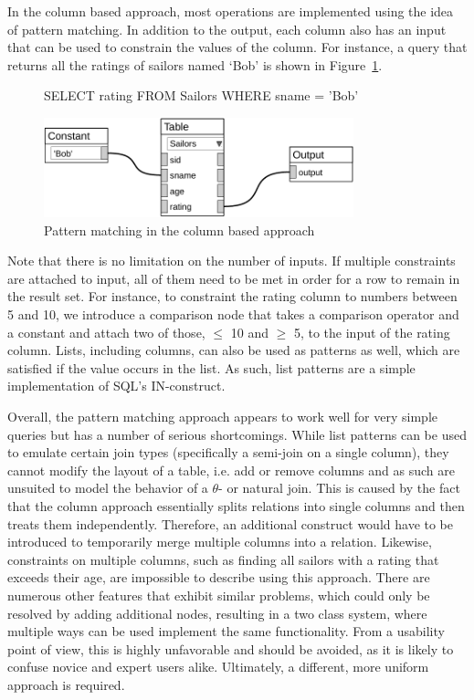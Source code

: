 \documentclass[11pt,a4paper]{globis-book}
\begin{document}
In the column based approach, most operations are implemented using the idea of pattern matching. In addition to the output, each column also has an input that can be used to constrain the values of the column. For instance, a query that returns all the ratings of sailors named `Bob' is shown in Figure~\ref{fig:col_patmat}.

\begin{figure}[h]
\begin{codeex}
SELECT rating
FROM Sailors
WHERE sname = 'Bob'
\end{codeex}

  \centering
  \includegraphics[width=0.8\textwidth]{resources/ColPatMat.pdf}
  \caption{Pattern matching in the column based approach}
  \label{fig:col_patmat}
\end{figure}

Note that there is no limitation on the number of inputs. If multiple constraints are attached to input, all of them need to be met in order for a row to remain in the result set. For instance, to constraint the rating column to numbers between 5 and 10, we introduce a comparison node that takes a comparison operator and a constant and attach two of those, $\leq$ 10 and $\geq$ 5, to the input of the rating column. Lists, including columns, can also be used as patterns as well, which are satisfied if the value occurs in the list. As such, list patterns are a simple implementation of SQL's IN-construct.

Overall, the pattern matching approach appears to work well for very simple queries but has a number of serious shortcomings. While list patterns can be used to emulate certain join types (specifically a semi-join on a single column), they cannot modify the layout of a table, i.e. add or remove columns and as such are unsuited to model the behavior of a $\theta$- or natural join. This is caused by the fact that the column approach essentially splits relations into single columns and then treats them independently. Therefore, an additional construct would have to be introduced to temporarily merge multiple columns into a relation. Likewise, constraints on multiple columns, such as finding all sailors with a rating that exceeds their age, are impossible to describe using this approach. There are numerous other features that exhibit similar problems, which could only be resolved by adding additional nodes, resulting in a two class system, where multiple ways can be used implement the same functionality. From a usability point of view, this is highly unfavorable and should be avoided, as it is likely to confuse novice and expert users alike. Ultimately, a different, more uniform approach is required.
\end{document}
